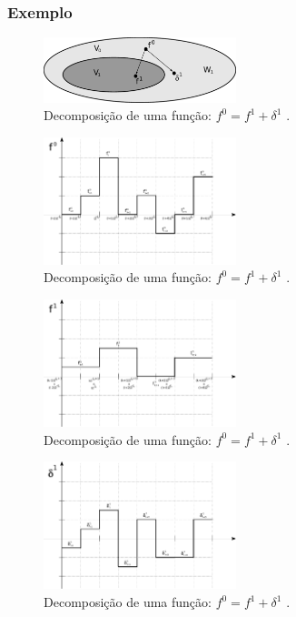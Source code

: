 \begin{frame}[allowframebreaks]
  \frametitle{Exemplo}
    \begin{figure}[htp]
    \centering
    \includegraphics[width=0.5\textwidth]{images/fun_f0_d.pdf}
    \caption{Decomposição de uma função: $f^0 = f^1 + \delta^1$ \citep{araujo2007}.}
    \label{fig-funf1}
    \end{figure}

    \framebreak

    \begin{figure}[htp]
    \centering
    \includegraphics[width=0.5\textwidth]{images/fun_f0_1.pdf}
    \caption{Decomposição de uma função: $f^0 = f^1 + \delta^1$ \citep{araujo2007}.}
    \label{fig-funf1}
    \end{figure}

    \framebreak

    \begin{figure}[htp]
    \centering
    \includegraphics[width=0.5\textwidth]{images/fun_f0_2.pdf}
    \caption{Decomposição de uma função: $f^0 = f^1 + \delta^1$ \citep{araujo2007}.}
    \label{fig-funf2}
    \end{figure}

    \framebreak

    \begin{figure}[htp]
    \centering
    \includegraphics[width=0.5\textwidth]{images/fun_f0_3.pdf}
    \caption{Decomposição de uma função: $f^0 = f^1 + \delta^1$ \citep{araujo2007}.}
    \label{fig-funf3}
    \end{figure} 


\end{frame}
